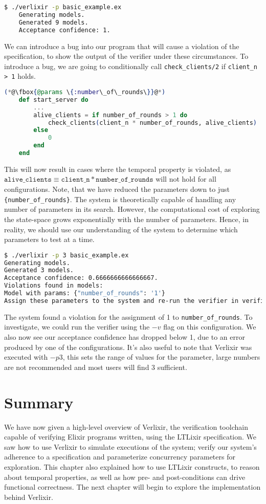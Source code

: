 \begin{lstlisting}[language=bash, xleftmargin=.1\linewidth]
    $ ./verlixir -p basic_example.ex 
    Generating models.
    Generated 9 models.
    Acceptance confidence: 1.
\end{lstlisting}
We can introduce a bug into our program that will cause a violation of the specification, to show the output of the verifier under these circumstances. To introduce a bug, we are going to conditionally call \texttt{check\_clients/2} if \texttt{client\_n > 1} holds.
\begin{lstlisting}[language=Elixir, xleftmargin=.1\linewidth]
    (*@\fbox{@params \{:number\_of\_rounds\}}@*)
    def start_server do
        ...
        alive_clients = if number_of_rounds > 1 do
            check_clients(client_n * number_of_rounds, alive_clients)
        else
            0
        end
    end
\end{lstlisting}
This will now result in cases where the temporal property is violated, as $\texttt{alive\_clients} \equiv \texttt{client\_n} * \texttt{number\_of\_rounds}$ will not hold for all configurations. Note, that we have reduced the parameters down to just \texttt{\{number\_of\_rounds\}}. The system is theoretically capable of handling any number of parameters in its search. However, the computational cost of exploring the state-space grows exponentially with the number of parameters. Hence, in reality, we should use our understanding of the system to determine which parameters to test at a time.
\begin{lstlisting}[language=bash, xleftmargin=.1\linewidth]
$ ./verlixir -p 3 basic_example.ex
Generating models.
Generated 3 models.
Acceptance confidence: 0.6666666666666667.
Violations found in models:
Model with params: {"number_of_rounds": '1'}
Assign these parameters to the system and re-run the verifier in verification mode to gather a trace.
\end{lstlisting}
The system found a violation for the assignment of 1 to \texttt{number\_of\_rounds}. To investigate, we could run the verifier using the $-v$ flag on this configuration. We also now see our acceptance confidence has dropped below 1, due to an error produced by one of the configurations. It's also useful to note that Verlixir was executed with $-p 3$, this sets the range of values for the parameter, large numbers are not recommended and most users will find 3 sufficient. 
\section{Summary}
We have now given a high-level overview of Verlixir, the verification toolchain capable of verifying Elixir programs written, using the LTLixir specification. We saw how to use Verlixir to simulate executions of the system; verify our system's adherence to a specification and parameterize concurrency parameters for exploration. This chapter also explained how to use LTLixir constructs, to reason about temporal properties, as well as how pre- and post-conditions can drive functional correctness. The next chapter will begin to explore the implementation behind Verlixir.